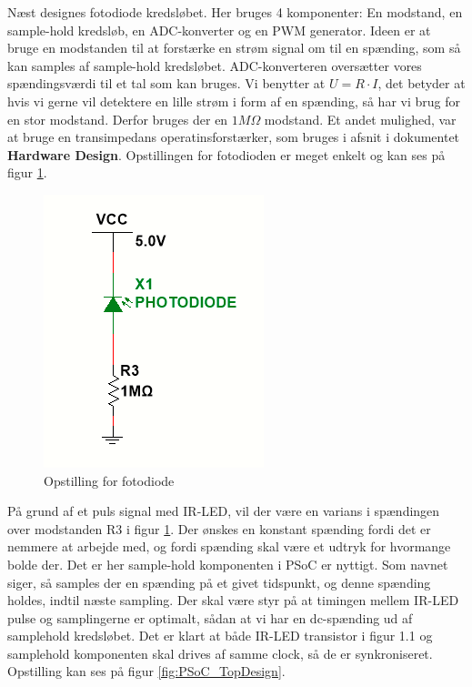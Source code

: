 \documentclass[HardwareDesign/HardwareDesign_main.tex]{subfiles}
\begin{document}
Næst designes fotodiode kredsløbet. Her bruges 4 komponenter: En modstand, en sample-hold kredsløb, en ADC-konverter og en PWM generator. Ideen er at bruge en modstanden til at forstærke en strøm signal om til en spænding, som så kan samples af sample-hold kredsløbet. ADC-konverteren oversætter vores spændingsværdi til et tal som kan bruges.
Vi benytter at $U=R\cdot I$, det betyder at hvis vi gerne vil detektere en lille strøm i form af en spænding, så har vi brug for en stor modstand. Derfor bruges der en $1M\Omega$ modstand. Et andet mulighed, var at bruge en transimpedans operatinsforstærker, som bruges i afsnit  i dokumentet \textbf{Hardware Design}. Opstillingen for fotodioden er meget enkelt og kan ses på figur \ref{fig:fotodiode_opstilling}.
\begin{figure}[H]
    \centering
    \includegraphics{Rapport/BallDispenser/BallCountSensor/graphics/Opstilling1_2.png}
    \caption{Opstilling for fotodiode}
    \label{fig:fotodiode_opstilling}
\end{figure}
På grund af et puls signal med IR-LED, vil der være en varians i spændingen over modstanden R3 i figur \ref{fig:fotodiode_opstilling}. Der ønskes en konstant spænding fordi det er nemmere at arbejde med, og fordi spænding skal være et udtryk for hvormange bolde der. Det er her sample-hold komponenten i PSoC er nyttigt. Som navnet siger, så samples der en spænding på et givet tidspunkt, og denne spænding holdes, indtil næste sampling. Der skal være styr på at timingen mellem IR-LED pulse og samplingerne er optimalt, sådan at vi har en dc-spænding ud af samplehold kredsløbet. Det er klart at både IR-LED transistor i figur 1.1 og samplehold komponenten skal drives af samme clock, så de er synkroniseret. Opstilling kan ses på  figur \ref{fig:PSoC_TopDesign}.
\end{document}
